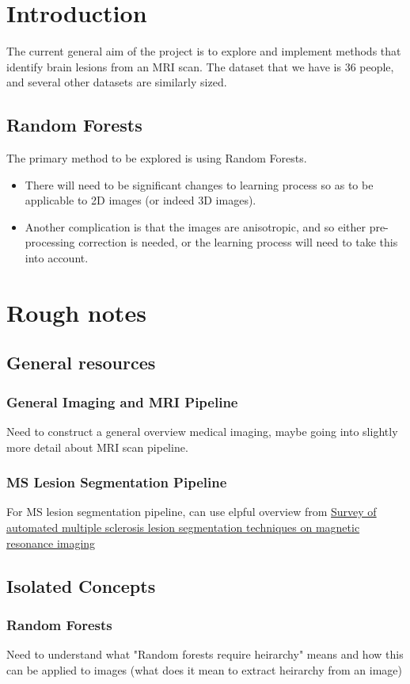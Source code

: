 \documentclass{report}
\begin{document}
\chapter{Introduction}
The current general aim of the project is to explore and implement methods that identify brain lesions from an MRI scan.  The dataset that we have is 36 people, and several other datasets are similarly sized. 

\section{Random Forests}
The primary method to be explored is using Random Forests.
\begin{itemize}
	\item There will need to be significant changes to learning process so as to be applicable to 2D images (or indeed 3D images). 
	\item Another complication is that the images are anisotropic, and so either pre-processing correction is needed, or the learning process will need to take this into account.
\end{itemize}
\chapter{Rough notes}
\section{General resources}
\subsection{General Imaging and MRI Pipeline}
Need to construct a general overview medical imaging, maybe going into slightly more detail about MRI scan pipeline. 
\subsection{MS Lesion Segmentation Pipeline}
For MS lesion segmentation pipeline, can use elpful overview from \href{https://pdf.sciencedirectassets.com/271303/1-s2.0-S0895611118X00081/1-s2.0-S0895611118303227/main.pdf}{Survey of automated multiple sclerosis lesion segmentation
techniques on magnetic resonance imaging}
\section{Isolated Concepts}
\subsection{Random Forests}
Need to understand what "Random forests require heirarchy" means and how this can be applied to images (what does it mean to extract heirarchy from an image)
\end{document}
